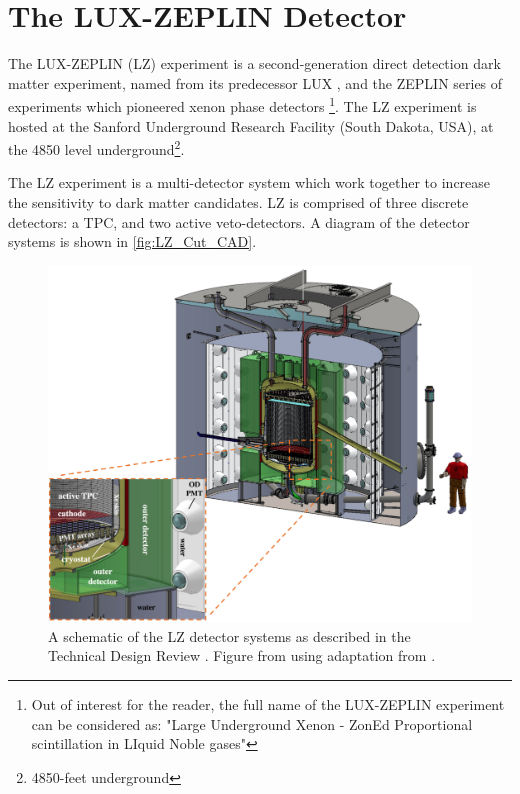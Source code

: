\section{The LUX-ZEPLIN Detector}
\label{sec:lz_detector}
\par
The LUX-ZEPLIN (LZ) experiment is a second-generation direct detection dark matter experiment, named from its predecessor LUX \cite{lux_ref}, and the ZEPLIN series of experiments which pioneered xenon phase detectors \cite{zeplin_3_ref}\footnote{Out of interest for the reader, the full name of the LUX-ZEPLIN experiment can be considered as: "Large Underground Xenon - ZonEd Proportional scintillation in LIquid Noble gases"}.
The LZ experiment is hosted at the Sanford Underground Research Facility (South Dakota, USA), at the 4850 level underground\footnote{4850-feet underground}.

\par
The LZ experiment is a multi-detector system which work together to increase the sensitivity to dark matter candidates.
LZ is comprised of three discrete detectors: a TPC, and two active veto-detectors.
A diagram of the detector systems is shown in \autoref{fig:LZ_Cut_CAD}.

\begin{figure}
    \centering
    \includegraphics[width=\textwidth]{Figures/LZ/LZ_CAD_with_interactions.png}
    \caption{A schematic of the LZ detector systems as described in the Technical Design Review \cite{LZ_TechnicalDesignReview_ref}.
             Figure from \cite{LZ_TechnicalDesignReview_ref} using adaptation from \cite{LZ_Ibles_LZStats_Thesis_ref}.}
    \label{fig:LZ_Cut_CAD}
\end{figure}

